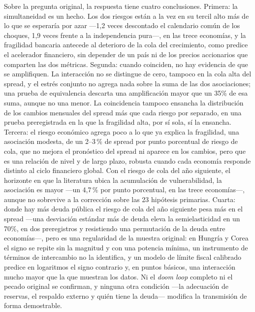 Sobre la pregunta original, la respuesta tiene cuatro conclusiones. Primera: la simultaneidad es un hecho. Los dos riesgos están a la vez en su tercil alto más de lo que se esperaría por azar ---1,2 veces descontado el calendario común de los choques, 1,9 veces frente a la independencia pura---, en las trece economías, y la fragilidad bancaria antecede al deterioro de la cola del crecimiento, como predice el acelerador financiero, sin depender de un país ni de los precios accionarios que comparten las dos métricas. Segunda: cuando coinciden, no hay evidencia de que se amplifiquen. La interacción no se distingue de cero, tampoco en la cola alta del spread, y el estrés conjunto no agrega nada sobre la suma de las dos asociaciones; una prueba de equivalencia descarta una amplificación mayor que un 35\% de esa suma, aunque no una menor. La coincidencia tampoco ensancha la distribución de los cambios mensuales del spread más que cada riesgo por separado, en una prueba preregistrada en la que la fragilidad alta, por sí sola, sí la ensancha. Tercera: el riesgo económico agrega poco a lo que ya explica la fragilidad, una asociación modesta, de un 2--3\,\% de spread por punto porcentual de riesgo de cola, que no mejora el pronóstico del spread ni aparece en los cambios, pero que es una relación de nivel y de largo plazo, robusta cuando cada economía responde distinto al ciclo financiero global. Con el riesgo de cola del año siguiente, el horizonte en que la literatura ubica la acumulación de vulnerabilidad, la asociación es mayor ---un 4,7\,\% por punto porcentual, en las trece economías---, aunque no sobrevive a la corrección sobre las 23 hipótesis primarias. Cuarta: donde hay más deuda pública el riesgo de cola del año siguiente pesa más en el spread ---una desviación estándar más de deuda eleva la semielasticidad en un 70\%, en dos preregistros y resistiendo una permutación de la deuda entre economías---, pero es una regularidad de la muestra original: en Hungría y Corea el signo se repite sin la magnitud y con una potencia mínima, un instrumento de términos de intercambio no la identifica, y un modelo de límite fiscal calibrado predice en logaritmos el signo contrario y, en puntos básicos, una interacción mucho mayor que la que muestran los datos. Ni el \textit{doom loop} completo ni el pecado original se confirman, y ninguna otra condición ---la adecuación de reservas, el respaldo externo y quién tiene la deuda--- modifica la transmisión de forma demostrable.

